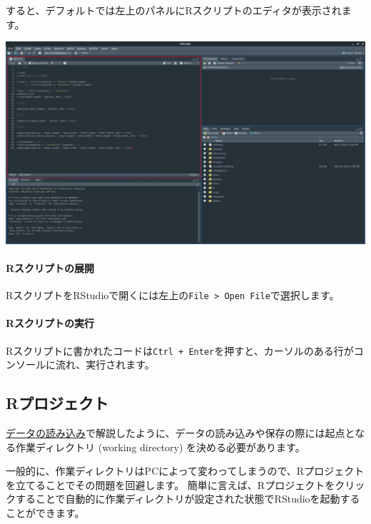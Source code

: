 \documentclass[]{bxjsreport}
\let\oldparagraph\paragraph
\renewcommand{\paragraph}[1]{\oldparagraph{#1}\mbox{}}
\let\asdf\section
\renewcommand{\section}{\chapter}
\let\asdff\subsection
\renewcommand{\subsection}{\asdf}
\renewcommand{\subsubsection}{\asdff}
\begin{document}
すると、デフォルトでは左上のパネルにRスクリプトのエディタが表示されます。

\includegraphics{figures/workflow6.jpg}

\hypertarget{rux30b9ux30afux30eaux30d7ux30c8ux306eux5c55ux958b}{%
\paragraph{Rスクリプトの展開}\label{rux30b9ux30afux30eaux30d7ux30c8ux306eux5c55ux958b}}

RスクリプトをRStudioで開くには左上の\texttt{File\ \textgreater{}\ Open\ File}で選択します。

\hypertarget{rux30b9ux30afux30eaux30d7ux30c8ux306eux5b9fux884c}{%
\paragraph{Rスクリプトの実行}\label{rux30b9ux30afux30eaux30d7ux30c8ux306eux5b9fux884c}}

Rスクリプトに書かれたコードは\texttt{Ctrl\ +\ Enter}を押すと、カーソルのある行がコンソールに流れ、実行されます。

\hypertarget{rux30d7ux30edux30b8ux30a7ux30afux30c8}{%
\subsubsection{Rプロジェクト}\label{rux30d7ux30edux30b8ux30a7ux30afux30c8}}

\protect\hyperlink{data-import}{データの読み込み}で解説したように、データの読み込みや保存の際には起点となる作業ディレクトリ (working directory) を決める必要があります。

一般的に、作業ディレクトリはPCによって変わってしまうので、Rプロジェクトを立てることでその問題を回避します。
簡単に言えば、Rプロジェクトをクリックすることで自動的に作業ディレクトリが設定された状態でRStudioを起動することができます。
\end{document}
